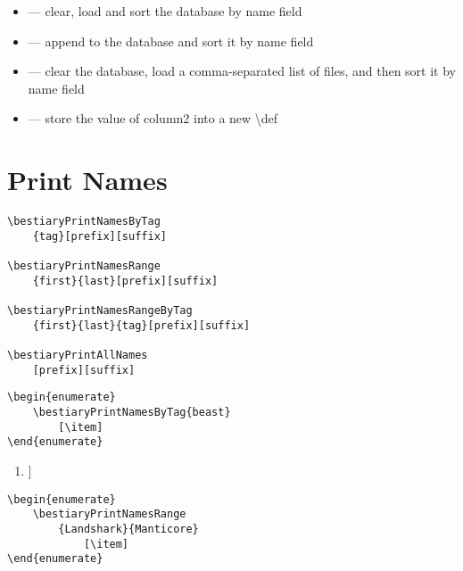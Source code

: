 \documentclass[itdr]{subfiles}
\begin{document}
\begin{minipage}{\textwidth}
\begin{itemize}
	\item {} --- clear, load and sort the database by name field
	\item {} --- append to the database and sort it by name field
	\item {} --- clear the database, load a comma-separated list of files, and then sort it by name field
	\item {} --- store the value of column2 into a new \textbackslash{}def
\end{itemize}

\end{minipage}

\vfill
\clearpage

\section{Print Names}

\begin{lstlisting}
\bestiaryPrintNamesByTag
	{tag}[prefix][suffix]

\bestiaryPrintNamesRange
	{first}{last}[prefix][suffix]

\bestiaryPrintNamesRangeByTag
	{first}{last}{tag}[prefix][suffix]

\bestiaryPrintAllNames
	[prefix][suffix]
\end{lstlisting}

\begin{lstlisting}
\begin{enumerate}
	\bestiaryPrintNamesByTag{beast}
		[\item]
\end{enumerate}
\end{lstlisting}

\begin{enumerate}
	[\item]
\end{enumerate}

\vfill

\begin{lstlisting}
\begin{enumerate}
	\bestiaryPrintNamesRange
		{Landshark}{Manticore}
			[\item]
\end{enumerate}
\end{lstlisting}
\end{document}
